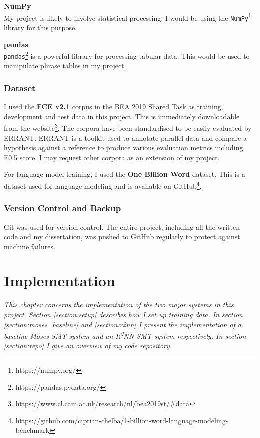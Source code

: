 \documentclass[12pt,a4paper,twoside,openright]{report}
\begin{document}
\textbf{NumPy} \\
My project is likely to involve statistical processing. I would be using the \texttt{NumPy}\footnote{https://numpy.org/} library for this purpose.

\textbf{pandas} \\
\texttt{pandas}\footnote{https://pandas.pydata.org/} is a powerful library for processing tabular data. This would be used to manipulate phrase tables in my project.

\subsection{Dataset}
I used the \textbf{FCE v2.1} corpus\cite{yannakoudakis-etal-2011-new} in the BEA 2019 Shared Task as training, development and test data in this project. This is immediately downloadable from the website\footnote{https://www.cl.cam.ac.uk/research/nl/bea2019st/\#data}. The corpora have been standardised to be easily evaluated by ERRANT\cite{bryant-etal-2017-automatic}\cite{felice-etal-2016-automatic}. ERRANT is a toolkit used to annotate parallel data and compare a hypothesis against a reference to produce various evaluation metrics including F0.5 score. I may request other corpora as an extension of my project.

For language model training, I used the \textbf{One Billion Word} dataset\cite{one-billion-word}. This is a dataset used for language modeling and is available on GitHub\footnote{https://github.com/ciprian-chelba/1-billion-word-language-modeling-benchmark}.

\subsection{Version Control and Backup}
Git was used for version control. The entire project, including all the written code and my dissertation, was pushed to GitHub regularly to protect against machine failures.


\chapter{Implementation}
\textit{This chapter concerns the implementation of the two major systems in this project. Section \ref{section:setup} describes how I set up training data. In section \ref{section:moses_baseline} and \ref{section:r2nn} I present the implementation of a baseline Moses SMT system and an R\textsuperscript{2}NN SMT system respectively. In section \ref{section:repo} I give an overview of my code repository.}
\end{document}
